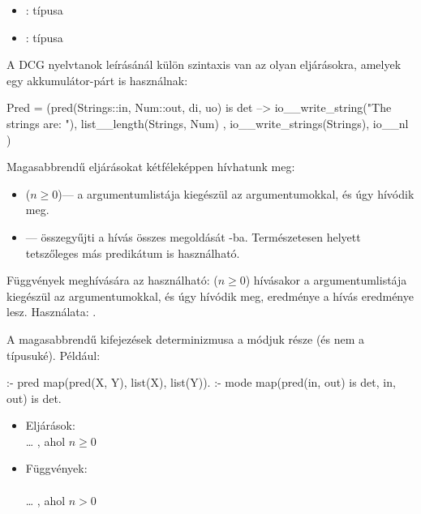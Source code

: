 \begin{itemize}
\item {}:  típusa 
\item {}:  típusa 
\end{itemize}

A DCG nyelvtanok leírásánál külön szintaxis van az olyan eljárásokra, amelyek
egy akkumulátor-párt is használnak:

\begin{prologcode}
Pred = (pred(Strings::in, Num::out, di, uo) is det -->
    io__write_string("The strings are: "),
    { list__length(Strings, Num) },
    io__write_strings(Strings),
    io__nl
)
\end{prologcode}

Magasabbrendű eljárásokat kétféleképpen hívhatunk meg:

\begin{itemize}
\item {} ($n\geq 0$)--- a 
argumentumlistája kiegészül az  argumentumokkal,
és úgy hívódik meg.
\item {} --- összegyűjti a 
hívás összes megoldását -ba. Természetesen  helyett
tetszőleges más predikátum is használható.
\end{itemize}

Függvények meghívására az  használható:
 ($n\geq 0$) hívásakor a 
argumentumlistája kiegészül az  argumentumokkal,
és úgy hívódik meg,  eredménye a hívás eredménye lesz. Használata:
.

A magasabbrendű kifejezések determinizmusa a módjuk része (és nem a típusuké).
Például:

\begin{prologcode}
:- pred map(pred(X, Y), list(X), list(Y)).
:- mode map(pred(in, out) is det, in, out) is det.
\end{prologcode}

\begin{itemize}
\item Eljárások:\\
\cd{,} \dots\cd{,} 
, ahol $n\geq 0$
\item Függvények:\\
   \\
\cd{,} \dots\cd{,} \cd{) =}
  , ahol $n>0$
\end{itemize}

